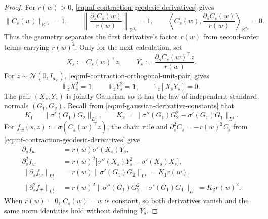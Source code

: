 \begin{proof}
For \(r(w)>0\), \cref{eq:mf-contraction-geodesic-derivatives} gives
\begin{equation}
\label{eq:mf-contraction-orthogonal-unit-pair}
 \|C_s(w)\|_{\mathbb R^{d_w}}=1,\qquad
 \left\|\frac{\partial_sC_s(w)}{r(w)}\right\|_{\mathbb R^{d_w}}=1,
 \qquad
 \left\langle C_s(w),\frac{\partial_sC_s(w)}{r(w)}
 \right\rangle_{\mathbb R^{d_w}}=0.
\end{equation}
Thus the geometry separates the first derivative's factor \(r(w)\) from
second-order terms carrying \(r(w)^2\).  Only for the next calculation, set
\[
 X_s:=C_s(w)^\top z,
 \qquad
 Y_s:=\frac{\partial_sC_s(w)^\top z}{r(w)}.
\]
For \(z\sim\mathcal N(0,I_{d_w})\),
\cref{eq:mf-contraction-orthogonal-unit-pair} gives
\[
 \mathbb E_zX_s^2=1,\qquad \mathbb E_zY_s^2=1,\qquad
 \mathbb E_z[X_sY_s]=0.
\]
The pair \((X_s,Y_s)\) is jointly Gaussian, so it has the law of independent
standard normals \((G_1,G_2)\).  Recall from
\cref{eq:mf-gaussian-derivative-constants} that
\[
 K_1=\|\sigma'(G_1)G_2\|_{L^4},\qquad
 K_2=\|\sigma''(G_1)G_2^2-\sigma'(G_1)G_1\|_{L^4}.
\]
For \(f_w(s,z):=\sigma(C_s(w)^\top z)\), the chain rule and
\(\partial_s^2C_s=-r(w)^2C_s\) from
\cref{eq:mf-contraction-geodesic-derivatives} give
\begin{equation}
\label{eq:mf-spherical-feature-derivatives}
\begin{aligned}
 \partial_s f_w
 &=r(w)\sigma'(X_s)Y_s,\\
 \partial_s^2 f_w
 &=r(w)^2\bigl[\sigma''(X_s)Y_s^2-\sigma'(X_s)X_s\bigr],\\
 \|\partial_s f_w\|_{L^4_z}
 &=r(w)\|\sigma'(G_1)G_2\|_{L^4}=K_1r(w),\\
 \|\partial_s^2 f_w\|_{L^4_z}
 &=r(w)^2\|\sigma''(G_1)G_2^2-\sigma'(G_1)G_1\|_{L^4}
 =K_2r(w)^2.
\end{aligned}
\end{equation}
When \(r(w)=0\), \(C_s(w)=w\) is constant, so both derivatives vanish and
the same norm identities hold without defining \(Y_s\).


\end{proof}
